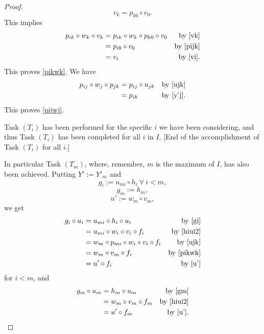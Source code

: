 \documentclass[12pt]{article}%
\theoremstyle{remark}
\theoremstyle{definition}
\begin{document}
\begin{proof}
\begin{equation}
v_k=p_{k0}\circ v_0.
\end{equation}
%
This implies
% 
\begin{align*}
p_{ik}\circ w_k\circ v_k&=p_{ik}\circ w_k\circ p_{k0}\circ v_0&\text{by \eqref{vk}}\\ 
&=p_{i0}\circ v_0&\text{by \eqref{pijk}}\\ 
&=v_i&\text{by \eqref{vi}}.
\end{align*}
%
This proves \eqref{pikwk}. We have 
% 
\begin{align*}
p_{ij}\circ w_j\circ p_{jk}&=p_{ij}\circ u_{jk}&\text{by \eqref{ujk}}\\ 
&=p_{ik}&\text{by \eqref{y'j}}.
\end{align*}
%
This proves \eqref{pijwj}. 

Task $(T_i)$ has been performed for the specific $i$ we have been considering, and thus Task $(T_i)$ has been completed for all $i$ in $I$. [End of the accomplishment of Task $(T_i)$ for all $i$.]

In particular Task $(T_m)$, where, remember, $m$ is the maximum of $I$, has also been achieved. Putting $Y':=Y'_m$ and 
%
\begin{equation}\label{gi}
g_i:=u_{mi}\circ h_i\ \forall\ i<m,
\end{equation}
%
\begin{equation}\label{gm}
g_m:=h_m,
\end{equation}
%
\begin{equation}\label{u'}
u':=w_m\circ v_m,
\end{equation}
%
we get
% 
\begin{align*}
g_i\circ u_i&=u_{mi}\circ h_i\circ u_i&\text{by \eqref{gi}}\\ 
&=u_{mi}\circ w_i\circ v_i\circ f_i&\text{by \eqref{hiui2}}\\ 
&=w_m\circ p_{mi}\circ w_i\circ v_i\circ f_i&\text{by \eqref{ujk}}\\ 
&=w_m\circ v_m\circ f_i&\text{by \eqref{pikwk}}\\ 
&=u'\circ f_i&\text{by \eqref{u'}}
\end{align*}
%
for $i<m$, and 
% 
\begin{align*}
g_m\circ u_m&=h_m\circ u_m&\text{by \eqref{gm}}\\ 
&=w_m\circ v_m\circ f_m&\text{by \eqref{hiui2}}\\ 
&=u'\circ f_m&\text{by \eqref{u'}}.
\end{align*}
%
\end{proof}
\end{document}
